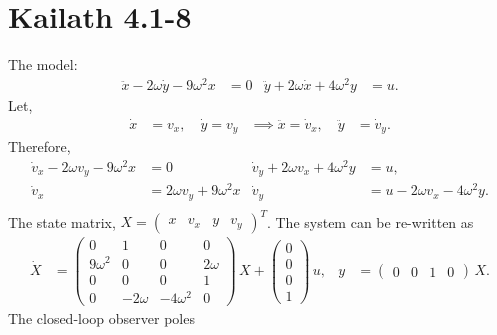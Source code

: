 \section{Kailath 4.1-8}
The model:
\begin{align*}
    \ddot x - 2\omega\dot y - 9\omega^2x &= 0 & \ddot y + 2\omega\dot x + 4\omega^2y &= u.
\end{align*}
Let, 
\begin{align*}
    \dot x &= v_x, \quad \dot y = v_y & \implies \ddot x = \dot v_x, \quad \ddot y &= \dot v_y. 
\end{align*}
Therefore, 
\begin{align*}
    \dot v_x - 2\omega v_y - 9\omega^2x &= 0 & \dot v_y + 2\omega v_x + 4\omega^2y &= u, \\
    \dot v_x &= 2\omega v_y + 9\omega^2x & \dot v_y &= u - 2\omega v_x - 4\omega^2y. \\
\end{align*}
The state matrix, $X = \begin{pmatrix} x & v_x & y & v_y \end{pmatrix}^T$. The system can be re-written as 
\newcommand{\A}{\begin{pmatrix}
    0 & 1 & 0 & 0\\
    9\omega^2 & 0 & 0 & 2\omega \\
    0 & 0 & 0 & 1 \\
    0 & -2\omega & -4\omega^2 & 0 
\end{pmatrix}}
\begin{align*}
    \dot X &= \A\,X + \begin{pmatrix}
        0 \\ 0 \\ 0 \\ 1
    \end{pmatrix}\,u, & y &= \begin{pmatrix}
        0 & 0 & 1 & 0
    \end{pmatrix}\,X.
\end{align*}
The closed-loop observer poles 
